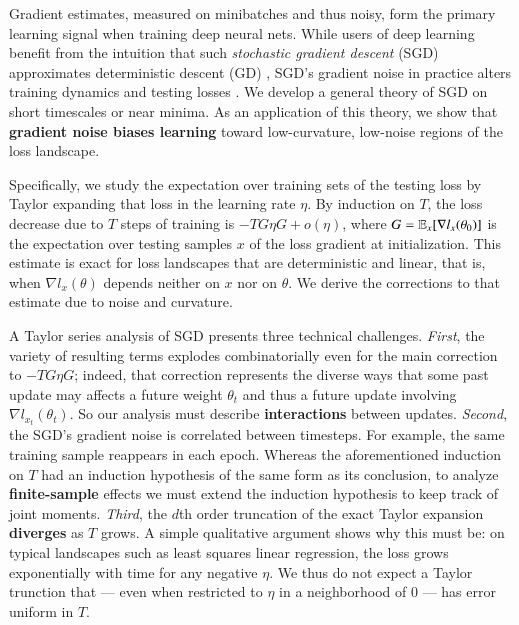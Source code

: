 
  Gradient estimates, measured on minibatches and thus noisy, form the primary
learning signal when training deep neural nets.  While users of deep learning
benefit from the intuition that such \emph{stochastic gradient descent} (SGD)
approximates deterministic descent (GD) \citep{bo91,le15}, SGD's
gradient noise in practice alters training dynamics and testing losses
\citep{go18,wu20}.  We develop a general theory of SGD on short timescales or
near minima.  As an application of this theory, we show that \textbf{gradient
noise biases learning} toward low-curvature, low-noise regions of the loss
landscape.

  Specifically, we study the expectation over training sets of the testing loss
by Taylor expanding that loss in the learning rate $\eta$.  By
induction on $T$, the loss decrease due to $T$ steps of training is 
$-T G\eta G + o(\eta)$, where $G=\mathbb{E}_x[\nabla l_x(\theta_0)]$ is the
expectation over testing samples $x$ of the loss gradient at initialization.
%
This estimate is exact for loss landscapes that are deterministic and linear,
that is, when $\nabla l_x(\theta)$ depends neither on $x$ nor on $\theta$.
We derive the corrections to that estimate due to noise and curvature.

  A Taylor series analysis of SGD presents three technical challenges.
%
\emph{First}, the variety of resulting terms explodes combinatorially even for
the main correction to $-T G\eta G$; indeed, that correction represents the
diverse ways that some past update may affects a future weight $\theta_t$ and
thus a future update involving $\nabla l_{x_t}(\theta_t)$.  So our
analysis must describe \textbf{interactions} between updates.
%
\emph{Second}, the SGD's gradient noise is correlated between timesteps.  For
example, the same training sample reappears in each epoch.  Whereas the
aforementioned induction on $T$ had an induction hypothesis of the same form
as its conclusion, to analyze \textbf{finite-sample} effects
we must extend the induction hypothesis to keep track of joint moments.  
%
\emph{Third}, the $d$th order truncation of the exact Taylor expansion \textbf{diverges}
as $T$ grows.  A simple qualitative argument shows why this must be: on typical
landscapes such as least squares linear regression, the loss grows
exponentially with time for any negative $\eta$.  We thus do not expect a
Taylor trunction that --- even when restricted to $\eta$ in a neighborhood of
$0$ --- has error uniform in $T$. 


